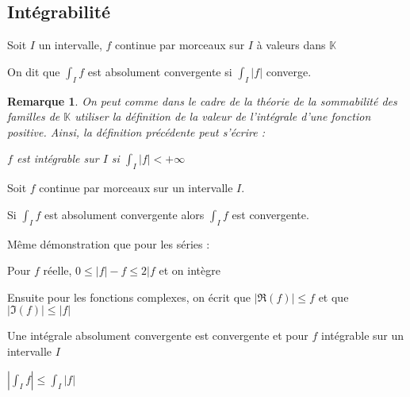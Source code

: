 \documentclass[a4paper,12pt]{book}
\newcommand{\Def}[2]{\begin{tcolorbox}[sharp corners, colback=white,colframe=blue!90!black!75, title=Définition : #1]#2\end{tcolorbox}}
\newcommand{\Thr}[2]{\begin{tcolorbox}[sharp corners, colback=white,colframe=red!90!black!75, title=Théorème : #1]#2\end{tcolorbox}}
\newcommand{\Prop}[2]{\begin{tcolorbox}[sharp corners, colback=white,colframe=red!90!black!75, title=Proposition : #1]#2\end{tcolorbox}}
\newcommand{\Pre}[1]{\begin{tcolorbox}[sharp corners, colback=white,colframe=green!60!green!30!black!75, title=Preuve]#1\end{tcolorbox}}
\newtheorem{Rem}{Remarque}[section]
\def\K{\mathbb{K}}
\begin{document}
\subsection{Intégrabilité}
\Def{}{Soit $I$ un intervalle, $f$ continue par morceaux sur $I$ à valeurs dans $\K$ \par On dit que $\int_If$ est absolument convergente si $\int_I\vert f\vert$ converge.}
\begin{Rem}
On peut comme dans le cadre de la théorie de la sommabilité des familles de $\K$ utiliser la définition de la valeur de l'intégrale d'une fonction positive. Ainsi, la définition précédente peut s'écrire : \par\begin{center} $f$ est intégrable sur $I$ si $\int_I\vert f\vert<+\infty$ \end{center}
\end{Rem}
\Thr{}{Soit $f$ continue par morceaux sur un intervalle $I$. \par Si $\int_If$ est absolument convergente alors $\int_If$ est convergente.}
\Pre{Même démonstration que pour les séries : \par Pour $f$ réelle, $0\leq \vert f\vert-f\leq 2\vert f$ et on intègre \par Ensuite pour les fonctions complexes, on écrit que $\vert \Re(f)\vert \leq f$ et que $\vert \Im(f)\vert\leq\vert f\vert$}
\Prop{}{Une intégrale absolument convergente est convergente et pour $f$ intégrable sur un intervalle $I$ \par \begin{center}$\left\vert\int_If\right\vert\leq \int_I\vert f\vert$\end{center}}
\end{document}
